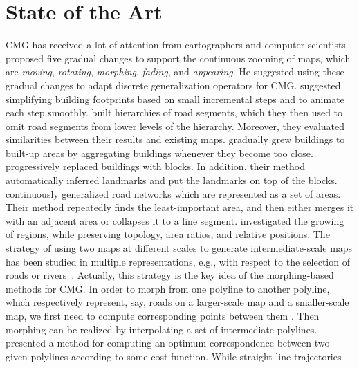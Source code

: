 \section{State of the Art}
\label{sec:Intro_State}


CMG has received a lot of attention
from cartographers and computer scientists.
\Textcite{vanKreveld2001} proposed five gradual changes
to support the continuous zooming of maps, 
which are \emph{moving}, \emph{rotating}, \emph{morphing}, 
\emph{fading}, and \emph{appearing}. 
He suggested using these gradual changes 
to adapt discrete generalization operators for CMG.
\textcite{Sester2005_CG} suggested simplifying building
footprints based on small incremental steps and 
to animate each step smoothly.
\textcite{Li2012Continuous} built hierarchies of road segments,
which they then used to omit road segments 
from lower levels of the hierarchy.
Moreover, they evaluated similarities 
between their results and existing maps.
\textcite{Peng2017Building} gradually grew
buildings to built-up areas by aggregating buildings 
whenever they become too close.
\textcite{Touya2017Progressive} progressively replaced
buildings with blocks. 
In addition, their method automatically inferred landmarks 
and put the landmarks on top of the blocks.
\textcite{Suba2016Road} continuously generalized road networks
which are represented as a set of areas.
Their method repeatedly finds the least-important area, 
and then either merges it with an adjacent area 
or collapses it to a line segment.
\textcite{Danciger2009} investigated the growing of regions, 
while preserving topology, area ratios, and
relative positions.
The strategy of using two maps at different scales
to generate intermediate-scale maps has been studied in multiple
representations, e.g., with respect to the selection of roads or
rivers~\parencite{Peng2012River,Girres2014}. 
Actually, this strategy is the key idea of the
morphing-based methods for CMG.
In order to morph from one polyline to another polyline,
which respectively represent, say, roads on a larger-scale map 
and a smaller-scale map, we first need to compute 
corresponding points between them 
\parencite[e.g.,][]{Cecconi2003,Noellenburg2008,Chazal2010BallMap,
Deng2015,Li2017_Building,Li2017Annealing}.
Then morphing can be realized by interpolating a set of 
intermediate polylines.
\textcite{Noellenburg2008} presented a method for computing an optimum
correspondence between two given polylines 
according to some cost function.
While straight-line trajectories 
